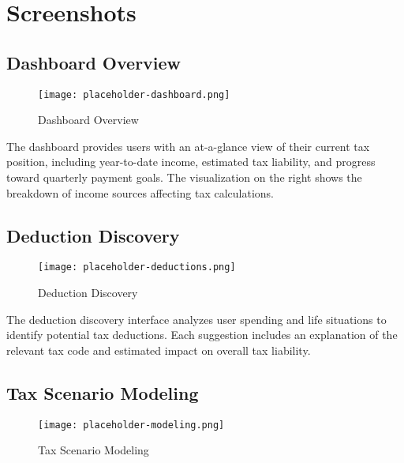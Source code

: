 \documentclass[
  11pt,
  letterpaper,
]{article}
\begin{document}
\hypertarget{screenshots}{%
\section{Screenshots}\label{screenshots}}

\hypertarget{dashboard-overview}{%
\subsection{Dashboard Overview}\label{dashboard-overview}}

\begin{figure}

{\centering \texttt{[image: placeholder-dashboard.png]}

}

\caption{Dashboard Overview}

\end{figure}

The dashboard provides users with an at-a-glance view of their current
tax position, including year-to-date income, estimated tax liability,
and progress toward quarterly payment goals. The visualization on the
right shows the breakdown of income sources affecting tax calculations.

\hypertarget{deduction-discovery}{%
\subsection{Deduction Discovery}\label{deduction-discovery}}

\begin{figure}

{\centering \texttt{[image: placeholder-deductions.png]}

}

\caption{Deduction Discovery}

\end{figure}

The deduction discovery interface analyzes user spending and life
situations to identify potential tax deductions. Each suggestion
includes an explanation of the relevant tax code and estimated impact on
overall tax liability.

\hypertarget{tax-scenario-modeling}{%
\subsection{Tax Scenario Modeling}\label{tax-scenario-modeling}}

\begin{figure}

{\centering \texttt{[image: placeholder-modeling.png]}

}

\caption{Tax Scenario Modeling}

\end{figure}
\end{document}
